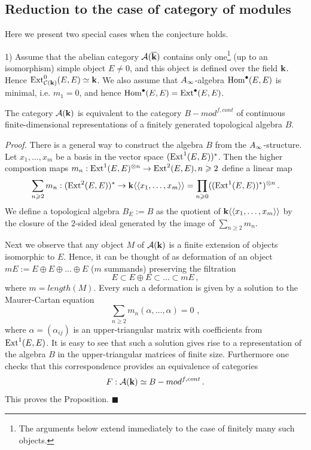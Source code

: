 \documentclass[12pt]{article}
\begin{document}
\subsection{Reduction to the case of category of modules}

Here we present two special cases when the conjecture holds.

1) Assume that the abelian category ${\cal A}({\overline{\bf k}})$ contains only one\footnote{The arguments below extend immediately to the case of finitely many such objects.} (up to an isomorphism) simple object $E\ne 0$, and this object is defined over the field ${\bf k}$.  Hence $\operatorname{Ext}^0_{{\mathcal C}({\bf k})}(E,E)\simeq {\bf k}$. We also assume that $A_{\infty}$-algebra $\operatorname{Hom}^\bullet(E,E)$ is minimal, i.e. $m_1=0$, and hence $\operatorname{Hom}^\bullet(E,E)=\operatorname{Ext}^\bullet(E,E)$.
\begin{prp} The category ${\cal A}({\bf k})$ is equivalent to the category $B-mod^{f,cont}$ of continuous finite-dimensional representations of a finitely generated topological algebra $B$.

\end{prp}
{\it Proof.} There is a general way to construct the algebra $B$ from the $A_{\infty}$-structure.
Let $x_1,\dots,x_m$ be a basis in the vector space $(\operatorname{Ext}^1(E,E))^{\ast}$. Then the higher compostion maps
$m_n:\operatorname{Ext}^1(E,E)^{\otimes n}\to \operatorname{Ext}^2(E,E), n\geqslant 2$ define a  linear map
$$\sum_{n\geqslant 2}m_n: (\operatorname{Ext}^2(E,E))^{\ast}\to {\bf k}\langle\langle x_1,\dots,x_m\rangle\rangle=\prod_{n\geqslant 0}((\operatorname{Ext}^1(E,E))^{\ast})^{\otimes n}\,.$$
We define a topological algebra
$B_E:=B$ as the quotient of
${\bf k}\langle\langle x_1,\dots,x_m\rangle\rangle$ by the closure of the $2$-sided ideal generated by the image of $\sum_{n\geqslant 2}m_n$.

Next we observe that any object $M$ of ${\cal A}({\bf k})$ is a finite extension of objects isomorphic to $E$. Hence, it can be thought of as deformation of an object $mE:=E\oplus E\oplus\dots\oplus E$ ($m$ summands) preserving the filtration 
$$E\subset E\oplus E\subset\dots\subset mE\,,$$ where $m=length(M)$. Every such a deformation is given by a solution to the Maurer-Cartan equation
$$\sum_{n\geqslant 2}m_n(\alpha,\dots,\alpha)=0\,\,,$$
where $\alpha=(\alpha_{ij})$ is an upper-triangular matrix with coefficients from $\operatorname{Ext}^1(E,E)$. It is easy to see that such a solution gives rise to a representation of the algebra $B$ in the upper-triangular matrices of finite size. Furthermore one checks that this correspondence provides an equivalence of categories 
$$F:{\cal A}({\bf k})\simeq B-mod^{f,cont}\,.$$ This proves the Proposition. $\blacksquare$
\end{document}
